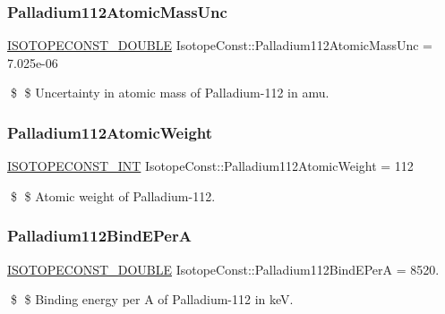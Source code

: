 \subsubsection{\texorpdfstring{Palladium112\+Atomic\+Mass\+Unc}{Palladium112AtomicMassUnc}}
{\footnotesize\ttfamily \mbox{\hyperlink{group___isotope_const-_macros_ga8f45a7272ce02c0b4c65c44636ed719a}{I\+S\+O\+T\+O\+P\+E\+C\+O\+N\+S\+T\+\_\+\+D\+O\+U\+B\+LE}} Isotope\+Const\+::\+Palladium112\+Atomic\+Mass\+Unc = 7.\+025e-\/06}

\$ \$ Uncertainty in atomic mass of Palladium-\/112 in amu. \mbox{\label{group___isotope_const-_palladium-_pd112_ga4bdb9f818ed5c5ba99ef9cc08ee57fd5}} 
\subsubsection{\texorpdfstring{Palladium112\+Atomic\+Weight}{Palladium112AtomicWeight}}
{\footnotesize\ttfamily \mbox{\hyperlink{group___isotope_const-_macros_ga5f18360b3e99483a35c32d789e62621c}{I\+S\+O\+T\+O\+P\+E\+C\+O\+N\+S\+T\+\_\+\+I\+NT}} Isotope\+Const\+::\+Palladium112\+Atomic\+Weight = 112}

\$ \$ Atomic weight of Palladium-\/112. \mbox{\label{group___isotope_const-_palladium-_pd112_gaa102b3e0b0aad53b096f94f7e061a1bd}} 
\subsubsection{\texorpdfstring{Palladium112\+Bind\+E\+PerA}{Palladium112BindEPerA}}
{\footnotesize\ttfamily \mbox{\hyperlink{group___isotope_const-_macros_ga8f45a7272ce02c0b4c65c44636ed719a}{I\+S\+O\+T\+O\+P\+E\+C\+O\+N\+S\+T\+\_\+\+D\+O\+U\+B\+LE}} Isotope\+Const\+::\+Palladium112\+Bind\+E\+PerA = 8520.}

\$ \$ Binding energy per A of Palladium-\/112 in keV. \mbox{\label{group___isotope_const-_palladium-_pd112_ga1ad4acda597a319189d89476f7c5c0e0}} 
